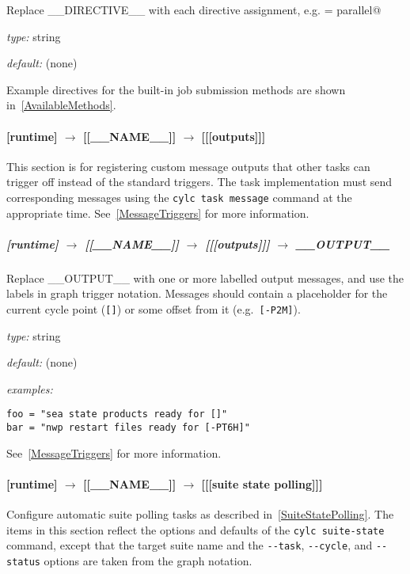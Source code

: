 Replace \_\_DIRECTIVE\_\_ with each directive assignment, e.g.
\lstinline@class = parallel@

\begin{myitemize}
\item {\em type:} string
\item {\em default:} (none)
\end{myitemize}

Example directives for the built-in job submission methods are shown
in~\ref{AvailableMethods}.

\paragraph[{[[[}outputs{]]]}]{[runtime] $\rightarrow$ [[\_\_NAME\_\_]] $\rightarrow$ [[[outputs]]]}

This section is for registering custom message outputs that other tasks can
trigger off instead of the standard triggers. The task implementation must send
corresponding messages using the \lstinline=cylc task message= command at the
appropriate time. See~\ref{MessageTriggers} for more information.

\subparagraph[\_\_OUTPUT\_\_ ]{[runtime] $\rightarrow$ [[\_\_NAME\_\_]] $\rightarrow$ [[[outputs]]] $\rightarrow$ \_\_OUTPUT\_\_}

Replace \_\_OUTPUT\_\_ with one or more labelled output messages, and use the
labels in graph trigger notation.  Messages should contain a placeholder for
the current cycle point (\lstinline=[]=) or some offset from it (e.g.\ \lstinline=[-P2M]=).
\begin{myitemize}
    \item {\em type:} string
    \item {\em default:} (none)
    \item{ \em examples:}
\end{myitemize}
\begin{lstlisting}
foo = "sea state products ready for []"
bar = "nwp restart files ready for [-PT6H]"
\end{lstlisting}
See~\ref{MessageTriggers} for more information.

\paragraph[{[[[}suite state polling{]]]}]{[runtime] $\rightarrow$ [[\_\_NAME\_\_]] $\rightarrow$ [[[suite state polling]]]}

\lstset{language=transcript}
Configure automatic suite polling tasks as described
in~\ref{SuiteStatePolling}. The
items in this section reflect the options and defaults of the
\lstinline=cylc suite-state= command, except that the target suite name and the
\lstinline=--task=, \lstinline=--cycle=, and \lstinline=--status= options are
taken from the graph notation.

